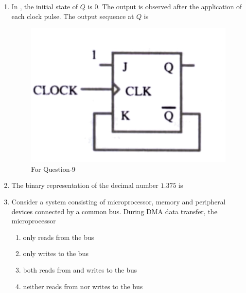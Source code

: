 \documentclass[journal,12pt,onecolumn]{IEEEtran}
\theoremstyle{remark}
\begin{document}
\begin{enumerate}
 
\item In , the initial state of $Q$ is $0$. The output is observed after the application of each clock pulse. The output sequence at $Q$ is\par \hfill{}
\begin{figure}[H]
    \centering
    \includegraphics[width=0.3\columnwidth]{Figs/Q-9.jpg}
    \caption{For Question-9}
    \label{fig:placeholder_4}
\end{figure}
\begin{enumerate}
\end{enumerate}

 
\item The binary representation of the decimal number $1.375$ is\par \hfill{}
\begin{enumerate}
\end{enumerate}

\item Consider a system consisting of microprocessor, memory and peripheral devices connected by a common bus. During DMA data transfer, the microprocessor\par \hfill{}
    \begin{enumerate}
        \item only reads from the bus
        \item only writes to the bus
        \item both reads from and writes to the bus
        \item neither reads from nor writes to the bus
\end{enumerate}


\end{enumerate}
\end{document}
